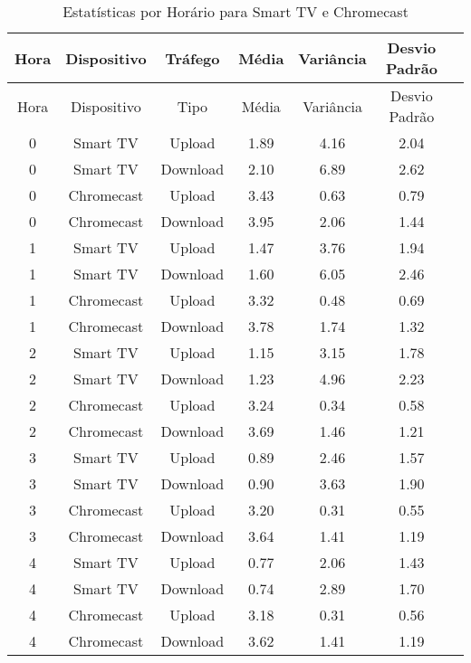 \begin{longtable}{|c|c|c|c|c|c|c|}
    \caption{Estatísticas por Horário para Smart TV e Chromecast}
    \label{tab:estatisticas_por_horario} \\
    \hline
    Hora & Dispositivo & Tráfego & Média & Variância & Desvio Padrão \\
    \hline
    \endfirsthead

    \hline
    Hora & Dispositivo & Tipo & Média & Variância & Desvio Padrão \\
    \hline
    \endhead

    \hline
    \endfoot

    \hline
    \endlastfoot

    0 & Smart TV & Upload & 1.89 & 4.16 & 2.04 \\
    0 & Smart TV & Download & 2.10 & 6.89 & 2.62 \\
    0 & Chromecast & Upload & 3.43 & 0.63 & 0.79 \\
    0 & Chromecast & Download & 3.95 & 2.06 & 1.44 \\
    \hline
    1 & Smart TV & Upload & 1.47 & 3.76 & 1.94 \\
    1 & Smart TV & Download & 1.60 & 6.05 & 2.46 \\
    1 & Chromecast & Upload & 3.32 & 0.48 & 0.69 \\
    1 & Chromecast & Download & 3.78 & 1.74 & 1.32 \\
    \hline
    2 & Smart TV & Upload & 1.15 & 3.15 & 1.78 \\
    2 & Smart TV & Download & 1.23 & 4.96 & 2.23 \\
    2 & Chromecast & Upload & 3.24 & 0.34 & 0.58 \\
    2 & Chromecast & Download & 3.69 & 1.46 & 1.21 \\
    \hline
    3 & Smart TV & Upload & 0.89 & 2.46 & 1.57 \\
    3 & Smart TV & Download & 0.90 & 3.63 & 1.90 \\
    3 & Chromecast & Upload & 3.20 & 0.31 & 0.55 \\
    3 & Chromecast & Download & 3.64 & 1.41 & 1.19 \\
    \hline
    4 & Smart TV & Upload & 0.77 & 2.06 & 1.43 \\
    4 & Smart TV & Download & 0.74 & 2.89 & 1.70 \\
    4 & Chromecast & Upload & 3.18 & 0.31 & 0.56 \\
    4 & Chromecast & Download & 3.62 & 1.41 & 1.19 \\

\end{longtable}
